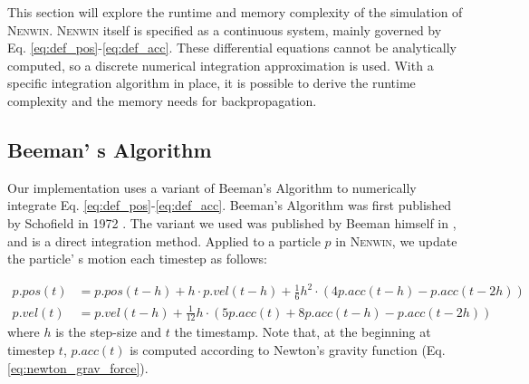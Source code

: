 This section will explore the runtime and memory complexity of the simulation of \textsc{Nenwin}. \textsc{Nenwin} itself is specified as a continuous system, mainly governed by Eq. \eqref{eq:def_pos}-\eqref{eq:def_acc}. These differential equations cannot be analytically computed, so a discrete numerical integration approximation is used. With a specific integration algorithm in place, it is possible to derive the runtime complexity and the memory needs for backpropagation.

\subsection{Beeman' s Algorithm}
Our implementation uses a variant of Beeman's Algorithm to numerically integrate Eq. \eqref{eq:def_pos}-\eqref{eq:def_acc}. Beeman's Algorithm was first published by Schofield in 1972 \cite{beemans_alg}. The variant we used was published by Beeman himself in \cite{BEEMAN1976}, and is a direct integration method. Applied to a particle $p$ in \textsc{Nenwin}, we update the particle' s motion each timestep as follows:

\begin{align}
    p.pos(t) & = p.pos(t-h) + h \cdot p.vel(t-h) + \frac{1}{6} h^2 \cdot (4p.acc(t-h) - p.acc(t-2h)) \label{eq:beeman_pos}\\
    p.vel(t) & = p.vel(t - h) + \frac{1}{12}h \cdot (5 p.acc(t) + 8 p.acc(t-h) - p.acc(t-2h)) \label{eq:beeman_vel}
\end{align}
where $h$ is the step-size and $t$ the timestamp. Note that, at the beginning at timestep $t$, $p.acc(t)$ is computed according to Newton's gravity function (Eq. \eqref{eq:newton_grav_force}).

